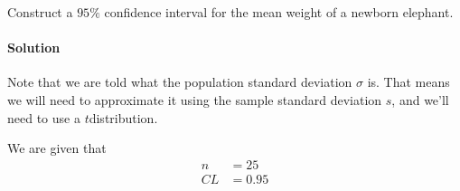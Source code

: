 \documentclass[letterpaper,10pt,english]{jupyterBook}
\begin{document}
\sphinxAtStartPar
Construct a \(95\%\) confidence interval for the mean weight of a newborn elephant.


\paragraph{Solution}
\label{\detokenize{Ch5 Confidence Intervals/5.4 Estimating Population Means (Sigma Unknown):solution}}
\sphinxAtStartPar
Note that we are  told what the population standard deviation \(\sigma\) is. That means we will need to approximate it using the sample standard deviation \(s\), and we’ll need to use a \(t\)\sphinxhyphen{}distribution.

\sphinxAtStartPar
We are given that
\begin{align*}
n &= 25 \\
CL &= 0.95
\end{align*}
\end{document}
